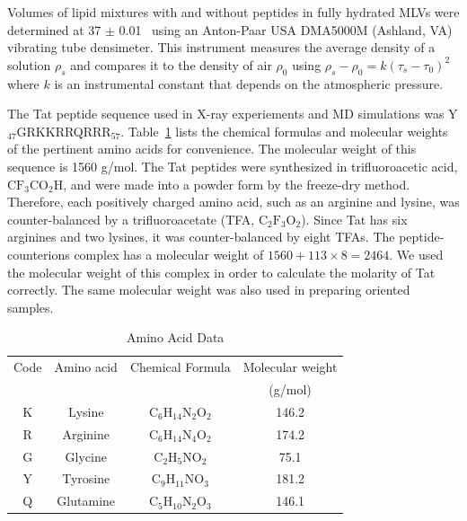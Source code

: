Volumes of lipid mixtures with and without peptides in fully hydrated 
MLVs were determined at 37 $\pm$ 0.01 \textcelsius\ 
using an Anton-Paar USA DMA5000M (Ashland, VA) vibrating tube densimeter. 
This instrument measures the average density of a solution $\rho_s$
and compares it to
the density of air $\rho_0$ using $\rho_s-\rho_0=k(\tau_s-\tau_0)^2$ where $k$ is
an instrumental constant that depends on the atmospheric pressure. 

The Tat peptide sequence used in X-ray experiements and MD simulations was 
Y$_{47}$GRKKRRQRRR$_{57}$. Table~\ref{tab:aa} lists the chemical formulas and 
molecular weights of the pertinent amino acids for convenience. 
The molecular weight of this sequence is 1560 g/mol.
The Tat peptides were synthesized in trifluoroacetic acid, $\mathrm{CF_3CO_2H}$, 
and were made into a powder form by the 
freeze-dry method. Therefore, each positively charged amino acid, such as 
an arginine and lysine, was counter-balanced by a trifluoroacetate (TFA, 
$\mathrm{C_2F_3O_2}$). Since Tat has six arginines and two lysines, 
it was counter-balanced by eight TFAs. 
The peptide-counterions complex has a molecular weight of 
$1560+113\times 8=2464$. We used the 
molecular weight of this complex in order to calculate the molarity of Tat
correctly. The same molecular weight was also used in preparing oriented 
samples.

\begin{table}[htbp]
  \centering
  \begin{tabular}{c c c c}
    \hline
    Code & Amino acid & Chemical Formula & Molecular weight \\
    & & & (g/mol) \\
    \hline
    K & Lysine & $\mathrm{C_6H_{14}N_2O_2}$ & 146.2 \\
    R & Arginine & $\mathrm{C_6H_{14}N_4O_2}$ & 174.2 \\
    G & Glycine & $\mathrm{C_2H_5NO_2}$ & 75.1\\
    Y & Tyrosine & $\mathrm{C_9H_{11}NO_3}$ & 181.2 \\
    Q & Glutamine & $\mathrm{C_5H_{10}N_2O_3}$ & 146.1 \\ 
    \hline
  \end{tabular}
  \caption{Amino Acid Data}
  \label{tab:aa}
\end{table}

